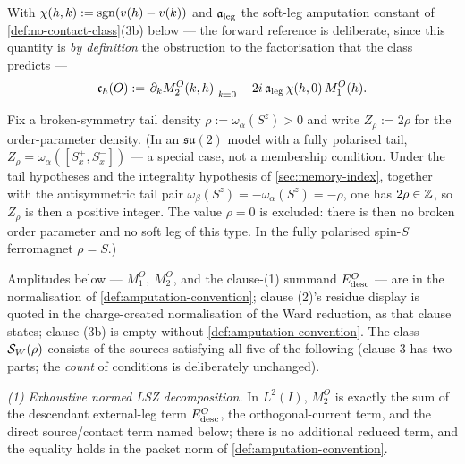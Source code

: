 \begin{definition}
\label{def:contact-first-jet}
With $\chi(h,k):=\operatorname{sgn}(v(h)-v(k))$ and $\mathfrak{a}_{\mathrm{leg}}$ the soft-leg amputation constant
of \cref{def:no-contact-class}(3b) below --- the forward reference is
deliberate, since this quantity is \emph{by definition} the obstruction to the
factorisation that the class predicts ---
\begin{equation}
  \mathfrak c_h(O):=\left.\partial_kM_2^O(k,h)\right|_{k=0}
  -2i\,\mathfrak{a}_{\mathrm{leg}}\,\chi(h,0)\,M_1^O(h).
  \label{eq:contact-first-jet}
\end{equation}
\end{definition}

\begin{definition}
\label{def:no-contact-class}
Fix a broken-symmetry tail density $\rho:=\omega_\alpha(S^z)>0$ and write
$Z_\rho:=2\rho$ for the order-parameter density. (In an $\mathfrak{su}(2)$
model with a fully polarised tail, $Z_\rho=\omega_\alpha([S^+_x,S^-_x])$ --- a
special case, not a membership condition. Under the tail hypotheses and the
integrality hypothesis of \cref{sec:memory-index}, together with the
antisymmetric tail pair $\omega_\beta(S^z)=-\omega_\alpha(S^z)=-\rho$, one has
$2\rho\in\mathbb{Z}$, so $Z_\rho$ is then a positive integer. The value $\rho=0$ is
excluded: there is then no broken order parameter and no soft leg of this
type. In the fully polarised spin-$S$ ferromagnet $\rho=S$.)

Amplitudes below --- $M_1^O$, $M_2^O$, and the clause-(1) summand
$E^O_{\rm desc}$ --- are in the normalisation of
\cref{def:amputation-convention}; clause (2)'s residue display is quoted in
the charge-created normalisation of the Ward reduction, as that clause states;
clause (3b) is empty without \cref{def:amputation-convention}. The class
$\mathcal{S}_W(\rho)$ consists of the sources satisfying all five of the following
(clause 3 has two parts; the \emph{count} of conditions is deliberately
unchanged).

\emph{(1) Exhaustive normed LSZ decomposition.} In $L^2(I)$, $M_2^O$ is
exactly the sum of the descendant external-leg term $E^O_{\rm desc}$, the
orthogonal-current term, and the direct source/contact term named below; there
is no additional reduced term, and the equality holds in the packet norm of
\cref{def:amputation-convention}.


\end{definition}
